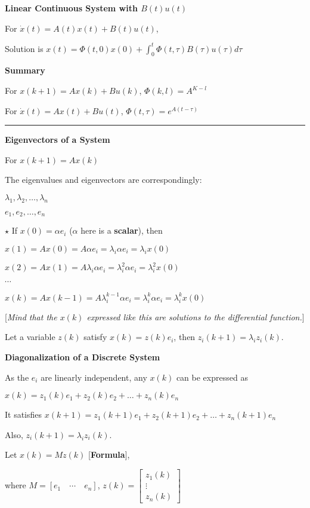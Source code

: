 \documentclass{article}
\newcommand{\sectionline}{\color{black}\rule[2pt]{0.45\textwidth}{0.05em}\color{black}}
\newcommand{\bigtitle}[1]{
	\noindent
	\textbf{#1}
}
\newcommand{\properframed}[1]{
	{
		\centering
		\vspace{-2 ex}
		\begin{framed}
			\vspace{-1.5 ex}
			#1
			\vspace{-1.5 ex}
		\end{framed}
		\vspace{-2 ex}
	}
}
\begin{document}
\begin{spacing}{1.2}
\bigtitle{Linear Continuous System with $B(t)u(t)$}

For $\dot{x}(t)=A(t) x(t)+B(t) u(t)$,

\properframed{
Solution is $x(t)=\Phi(t, 0) x(0)+\int_{0}^{t} \Phi(t, \tau) B(\tau) u(\tau) d \tau$
}

\bigtitle{Summary}

For
$x(k+1)=A x(k)+B u(k)$,
$\Phi(k, l)=A^{K-l}$

For
$\dot{x}(t)=A x(t)+B u(t)$,
$\Phi(t, \tau)=e^{A(t-\tau)}$


\sectionline

\bigtitle{Eigenvectors of a System}

For $x(k+1)=A x(k)$

The eigenvalues and eigenvectors are correspondingly:

$\lambda_{1}, \lambda_{2}, \ldots, \lambda_{n}$

$e_{1}, e_{2}, \ldots, e_{n}$

$\star$ If $x(0)=\alpha e_i$ ($\alpha$ here is a \textbf{scalar}), then 

$x(1)=A x(0)=A \alpha e_{i}=\lambda_{i} \alpha e_{i}=\lambda_{i} x(0)$

$x(2)=A x(1)=A \lambda_{i} \alpha e_{i}=\lambda_{i}^{2} \alpha e_{i}=\lambda_{i}^{2} x(0)$

$\cdots$

$x(k)=A x(k-1)=A \lambda_{i}^{k-1} \alpha e_{i}=\lambda_{i}^{k} \alpha e_{i}=\lambda_{i}^{k} x(0)$

[\textit{Mind that the $x(k)$ expressed like this are solutions to the differential function.}]

Let a variable $z(k)$ satisfy $x(k)=z(k)e_i$,
then $z_{i}(k+1)=\lambda_{i} z_{i}(k)$.

\bigtitle{Diagonalization of a Discrete System}

As the $e_i$ are linearly independent, any $x(k)$ can be expressed as 

$x(k)=z_{1}(k) e_{1}+z_{2}(k) e_{2}+\ldots+z_{n}(k) e_{n}$

It satisfies $x(k+1)=z_{1}(k+1) e_{1}+z_{2}(k+1) e_{2}+\ldots+z_{n}(k+1) e_{n}$

Also, $z_{i}(k+1)=\lambda_{i} z_{i}(k)$.

Let $x(k)=Mz(k)$ [\textbf{Formula}],

where $M=\left[ e_1 \quad \cdots \quad e_n \right]$,
$z(k)=\left[ \begin{array}{c}{z_{1}(k)} \\ {\vdots} \\ {z_{n}(k)}\end{array}\right]$


\end{spacing}
\end{document}
